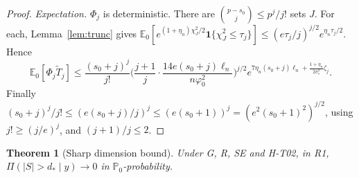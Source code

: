 \documentclass[11pt]{article}
\newtheorem{theorem}{Theorem}[section]
\theoremstyle{remark}
\newcommand{\E}{\mathbb E}
\renewcommand{\P}{\mathbb P}
\newcommand{\sst}{\sigma_\star}
\begin{document}
\begin{proof}
\emph{Expectation.} $\Phi_j$ is deterministic. There are $\binom{p-s_0}j\le p^j/j!$ sets $J$. For each, Lemma~\ref{lem:trunc} gives $\E_0[e^{(1+\eta_n)\chi^2_J/2}\mathbf 1\{\chi^2_J\le\tau_j\}]\le(e\tau_j/j)^{j/2}e^{\eta_n\tau_j/2}$. Hence
\[
\E_0[\Phi_j\tilde T_j]\le\frac{(s_0+j)^j}{j!}\Big(\frac{j+1}{j}\cdot\frac{14e(s_0+j)\ell_n}{n\varphi_0^2}\Big)^{j/2}e^{7\eta_n(s_0+j)\ell_n+\frac{1+\eta_n}{2\sst^2}\zeta_j}.
\]
Finally $(s_0+j)^j/j!\le(e(s_0+j)/j)^j\le(e(s_0+1))^j=(e^2(s_0+1)^2)^{j/2}$, using $j!\ge(j/e)^j$, and $(j+1)/j\le2$.
\end{proof}

\begin{theorem}[Sharp dimension bound]\label{thm:sharp}
Under G, R, SE and H-T02, in R1, $\Pi(|S|>d_\ast\mid y)\to0$ in $\P_0$-probability.
\end{theorem}
\end{document}
